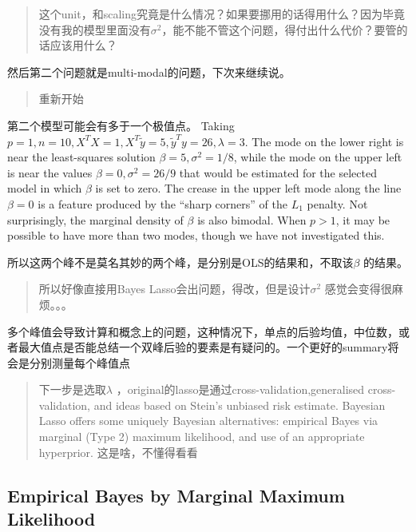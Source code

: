 \documentclass[
]{book}
\theoremstyle{definition}
\theoremstyle{definition}
\theoremstyle{definition}
\theoremstyle{remark}
\begin{document}
\begin{quote}
这个unit，和scaling究竟是什么情况？如果要挪用的话得用什么？因为毕竟没有我的模型里面没有\(\sigma^2\)，能不能不管这个问题，得付出什么代价？要管的话应该用什么？
\end{quote}

然后第二个问题就是multi-modal的问题，下次来继续说。

\begin{quote}
重新开始
\end{quote}

第二个模型可能会有多于一个极值点。 Taking \(p=1,n=10,X^TX=1,X^T\tilde y=5,\tilde y^Ty=26,\lambda=3\). The mode on the lower right is near the least-squares solution \(\beta=5,\sigma^2=1/8\), while the mode on the upper left is near the values \(\beta=0,\sigma^2=26/9\) that would be estimated for the selected model in which \(\beta\) is set to zero. The crease in the upper left mode along the line \(\beta=0\) is a feature produced by the ``sharp corners'' of the \(L_1\) penalty. Not surprisingly, the marginal density of \(\beta\) is also bimodal. When \(p>1\), it may be possible to have more than two modes, though we have not investigated this.

所以这两个峰不是莫名其妙的两个峰，是分别是OLS的结果和，不取该\(\beta\) 的结果。

\begin{quote}
所以好像直接用Bayes Lasso会出问题，得改，但是设计\(\sigma^2\) 感觉会变得很麻烦。。。
\end{quote}

多个峰值会导致计算和概念上的问题，这种情况下，单点的后验均值，中位数，或者最大值点是否能总结一个双峰后验的要素是有疑问的。一个更好的summary将会是分别测量每个峰值点

\begin{quote}
下一步是选取\(\lambda\) ，original的lasso是通过cross-validation,generalised cross-validation, and ideas based on Stein's unbiased risk estimate. Bayesian Lasso offers some uniquely Bayesian alternatives: empirical Bayes via marginal (Type 2) maximum likelihood, and use of an appropriate hyperprior. 这是啥，不懂得看看
\end{quote}

\hypertarget{empirical-bayes-by-marginal-maximum-likelihood}{%
\subsection{Empirical Bayes by Marginal Maximum Likelihood}\label{empirical-bayes-by-marginal-maximum-likelihood}}
\end{document}

